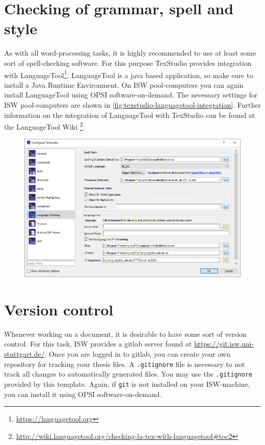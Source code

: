 \section{Checking of grammar, spell and style}
As with all word-processing tasks, it is highly recommended to use at least some sort of spell-checking software.
For this purpose TexStudio provides integration with LanguageTool\footnote{\url{https://languagetool.org}}. LanguageTool is a java based application, so make sure to install a Java Runtime Environment. On \ac{ISW} pool-computers you can again install LanguageTool using OPSI software-on-demand. The necessary settings for \ac{ISW} pool-computers are shown in \autoref{fig:texstudio-languagetool-integration}. Further information on the integration of LanguageTool with TexStudio can be found at the LanguageTool Wiki \footnote{\url{http://wiki.languagetool.org/checking-la-tex-with-languagetool\#toc2}}.

\begin{figure}
	\centering
	\includegraphics[width=0.9\linewidth]{example_images/texstudio-languagetool-integration}
	\caption[Settings for integrating LanguageTool with TexStudio on ISW computers]{}
	\label{fig:texstudio-languagetool-integration}
\end{figure}

\section{Version control}
\label{sec:version_control}
Whenever working on a document, it is desirable to have some sort of version control. For this task, \ac{ISW} provides a gitlab server found at \url{https://git.isw.uni-stuttgart.de/}. Once you are logged in to gitlab, you can create your own repository for tracking your thesis files. A \texttt{.gitignore} file is necessary to not track all changes to automatically generated files. You may use the \texttt{.gitignore} provided by this template. Again, if \texttt{git} is not installed on your \ac{ISW}-machine, you can install it using OPSI software-on-demand.

